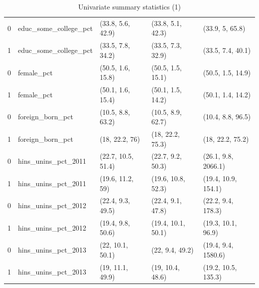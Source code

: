 \documentclass[12pt]{article}
\begin{document}
\begin{table}[ht]
\begin{tabular}{rllll}
  0 & educ\_some\_college\_pct & (33.8, 5.6, 42.9) & (33.8, 5.1, 42.3) & (33.9, 5, 65.8) \\ 
  1 & educ\_some\_college\_pct & (33.5, 7.8, 34.2) & (33.5, 7.3, 32.9) & (33.5, 7.4, 40.1) \\ 
  0 & female\_pct & (50.5, 1.6, 15.8) & (50.5, 1.5, 15.1) & (50.5, 1.5, 14.9) \\ 
  1 & female\_pct & (50.1, 1.6, 15.4) & (50.1, 1.5, 14.2) & (50.1, 1.4, 14.2) \\ 
  0 & foreign\_born\_pct & (10.5, 8.8, 63.2) & (10.5, 8.9, 62.7) & (10.4, 8.8, 96.5) \\ 
  1 & foreign\_born\_pct & (18, 22.2, 76) & (18, 22.2, 75.3) & (18, 22.2, 75.2) \\ 
  0 & hins\_unins\_pct\_2011 & (22.7, 10.5, 51.4) & (22.7, 9.2, 50.3) & (26.1, 9.8, 2066.1) \\ 
  1 & hins\_unins\_pct\_2011 & (19.6, 11.2, 59) & (19.6, 10.8, 52.3) & (19.4, 10.9, 154.1) \\ 
  0 & hins\_unins\_pct\_2012 & (22.4, 9.3, 49.5) & (22.4, 9.1, 47.8) & (22.2, 9.4, 178.3) \\ 
  1 & hins\_unins\_pct\_2012 & (19.4, 9.8, 50.6) & (19.4, 10.1, 50.1) & (19.3, 10.1, 96.9) \\ 
  0 & hins\_unins\_pct\_2013 & (22, 10.1, 50.1) & (22, 9.4, 49.2) & (19.4, 9.4, 1580.6) \\ 
  1 & hins\_unins\_pct\_2013 & (19, 11.1, 49.9) & (19, 10.4, 48.6) & (19.2, 10.5, 135.3) \\ 
   \bottomrule
\end{tabular}
    \caption{Univariate summary statistics (1)}
    \label{tab:summarytab1}
\end{table}
\end{document}
